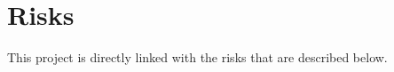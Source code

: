 \section{Risks} %
\label{sec:Risks}

This project is directly linked with the risks that are described below.





\item 


